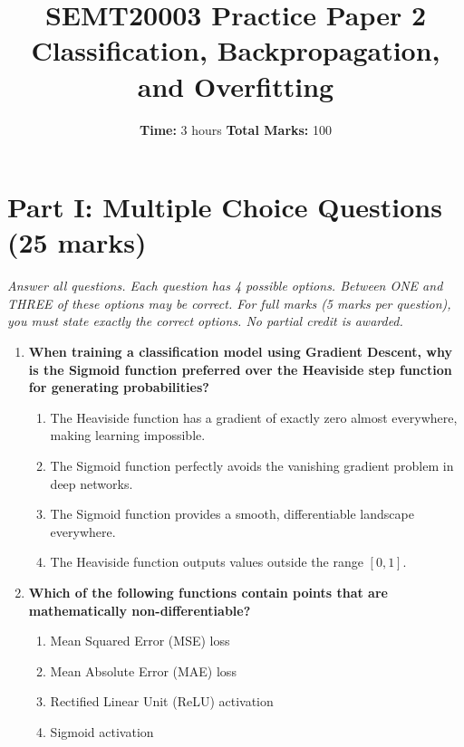 \documentclass[11pt]{article}
\title{\textbf{SEMT20003 Practice Paper 2}\\ Classification, Backpropagation, and Overfitting}
\author{}
\date{\textbf{Time:} 3 hours \quad \textbf{Total Marks:} 100}
\begin{document}
\maketitle

\section*{Part I: Multiple Choice Questions (25 marks)}
\textit{Answer all questions. Each question has 4 possible options. Between ONE and THREE of these options may be correct. For full marks (5 marks per question), you must state exactly the correct options. No partial credit is awarded.}

\begin{enumerate}
    \item \textbf{When training a classification model using Gradient Descent, why is the Sigmoid function preferred over the Heaviside step function for generating probabilities?}
    \begin{enumerate}
        \item[A)] The Heaviside function has a gradient of exactly zero almost everywhere, making learning impossible.
        \item[B)] The Sigmoid function perfectly avoids the vanishing gradient problem in deep networks.
        \item[C)] The Sigmoid function provides a smooth, differentiable landscape everywhere.
        \item[D)] The Heaviside function outputs values outside the range $[0, 1]$.
    \end{enumerate}
    \vspace{0.5cm}

    \item \textbf{Which of the following functions contain points that are mathematically non-differentiable?}
    \begin{enumerate}
        \item[A)] Mean Squared Error (MSE) loss
        \item[B)] Mean Absolute Error (MAE) loss
        \item[C)] Rectified Linear Unit (ReLU) activation
        \item[D)] Sigmoid activation
    \end{enumerate}
    \vspace{0.5cm}


\end{enumerate}
\end{document}
